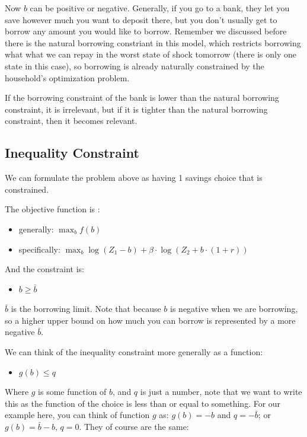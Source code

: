 \documentclass[
]{book}
\providecommand{\tightlist}{%
  \setlength{\itemsep}{0pt}\setlength{\parskip}{0pt}}
\begin{document}
Now \(b\) can be positive or negative. Generally, if you go to a bank,
they let you save however much you want to deposit there, but you don't
usually get to borrow any amount you would like to borrow. Remember we
discussed before there is the natural borrowing constriant in this
model, which restricts borrowing what what we can repay in the worst
state of shock tomorrow (there is only one state in this case), so
borrowing is already naturally constrained by the household's
optimization problem.

If the borrowing constraint of the bank is lower than the natural
borrowing constraint, it is irrelevant, but if it is tighter than the
natural borrowing constraint, then it becomes relevant.

\hypertarget{inequality-constraint}{%
\subsection{Inequality Constraint}\label{inequality-constraint}}

We can formulate the problem above as having 1 savings choice that is
constrained.

The objective function is :

\begin{itemize}
\item
  generally: \(\max_b f(b)\)
\item
  specifically:
  \(\max_b \log (Z_1 -b)+\beta \cdot \log (Z_2 +b\cdot (1+r))\)
\end{itemize}

And the constraint is:

\begin{itemize}
\tightlist
\item
  \(\displaystyle b\ge \bar{b}\)
\end{itemize}

\(\bar{b}\) is the borrowing limit. Note that because \(b\) is negative when
we are borrowing, so a higher upper bound on how much you can borrow is
represented by a more negative \(\bar{b}\).

We can think of the inequality constraint more generally as a function:

\begin{itemize}
\tightlist
\item
  \(\displaystyle g(b)\le q\)
\end{itemize}

Where \(g\) is some function of \(b\), and \(q\) is just a number, note that
we want to write this as the function of the choice is less than or
equal to something. For our example here, you can think of function \(g\)
as: \(g(b)=-b\) and \(q=-\bar{b}\); or \(g(b)=\bar{b} -b\), \(q=0\). They of
course are the same:
\end{document}
